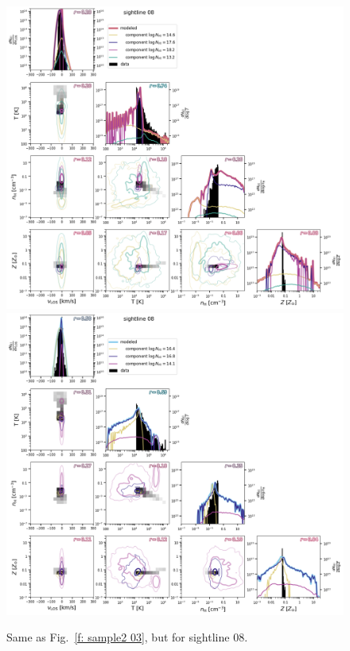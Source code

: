 \documentclass[fleqn,usenatbib]{mnras}
\begin{document}
\begin{figure}
    \centering
    \includegraphics[height=0.45\textheight]{figures/sample2/original/sightline_0008.png}
    \includegraphics[height=0.45\textheight]{figures/sample2/high-z/sightline_0008.png}
    \label{f: sample2 08}
    \caption{Same as Fig.~\ref{f: sample2 03}, but for sightline 08.}
\end{figure}
\end{document}
